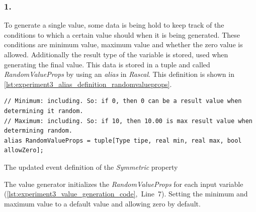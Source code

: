 \subsubsection{1. }
To generate a single value, some data is being hold to keep track of the conditions to which a certain value should when it is being generated. These conditions are minimum value, maximum value and whether the zero value is allowed. Additionally the result type of the variable is stored, used when generating the final value. This data is stored in a tuple and called \textit{RandomValueProps} by using an \textit{alias} in \textit{Rascal}. This definition is shown in \autoref{lst:experiment3_alias_definition_randomvalueprops}.
\begin{sourcecode}[!ht]
\begin{lstlisting}[language=Rascal]
// Minimum: including. So: if 0, then 0 can be a result value when determining it random.
// Maximum: including. So: if 10, then 10.00 is max result value when determining random.
alias RandomValueProps = tuple[Type tipe, real min, real max, bool allowZero];
\end{lstlisting}
\caption{The updated event definition of the \textit{Symmetric} property}
\label{lst:experiment3_alias_definition_randomvalueprops}
\end{sourcecode}
\FloatBarrier
The value generator initializes the \textit{RandomValueProps} for each input variable (\autoref{lst:experiment3_value_generation_code},~Line~7). Setting the minimum and maximum value to a default value and allowing zero by default.

